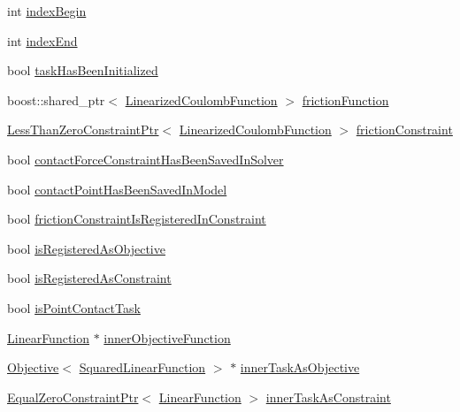 \begin{DoxyCompactItemize}
int \hyperlink{structgocra_1_1GHCJTTask_1_1Pimpl_a20542f3c613a7f9c0771c2b5ac0b38eb}{index\+Begin}
\item 
int \hyperlink{structgocra_1_1GHCJTTask_1_1Pimpl_ada601a59aeedcd018df465a5e2e79e03}{index\+End}
\item 
bool \hyperlink{structgocra_1_1GHCJTTask_1_1Pimpl_ad07475df136dd26fc89634fa6dd9a9b7}{task\+Has\+Been\+Initialized}
\item 
boost\+::shared\+\_\+ptr$<$ \hyperlink{classocra_1_1LinearizedCoulombFunction}{Linearized\+Coulomb\+Function} $>$ \hyperlink{structgocra_1_1GHCJTTask_1_1Pimpl_a777d7f0a74a42508154b153dbc0a3b44}{friction\+Function}
\item 
\hyperlink{classocra_1_1LessThanZeroConstraintPtr}{Less\+Than\+Zero\+Constraint\+Ptr}$<$ \hyperlink{classocra_1_1LinearizedCoulombFunction}{Linearized\+Coulomb\+Function} $>$ \hyperlink{structgocra_1_1GHCJTTask_1_1Pimpl_a51c9a1862cf46b8ac75a525924d990bb}{friction\+Constraint}
\item 
bool \hyperlink{structgocra_1_1GHCJTTask_1_1Pimpl_a2cb3237a503679f5dcc201c05b00f248}{contact\+Force\+Constraint\+Has\+Been\+Saved\+In\+Solver}
\item 
bool \hyperlink{structgocra_1_1GHCJTTask_1_1Pimpl_acd52e769176ed61ce95a322b1adc8c10}{contact\+Point\+Has\+Been\+Saved\+In\+Model}
\item 
bool \hyperlink{structgocra_1_1GHCJTTask_1_1Pimpl_ad92c2fff381cdb00f6afb41671e923c5}{friction\+Constraint\+Is\+Registered\+In\+Constraint}
\item 
bool \hyperlink{structgocra_1_1GHCJTTask_1_1Pimpl_ac3772fc7a816ef1ba5ac40b79908d225}{is\+Registered\+As\+Objective}
\item 
bool \hyperlink{structgocra_1_1GHCJTTask_1_1Pimpl_aace8728a2e9a0271ea89aea0355c036b}{is\+Registered\+As\+Constraint}
\item 
bool \hyperlink{structgocra_1_1GHCJTTask_1_1Pimpl_a900c0b0bf150ba085a300ff543054a36}{is\+Point\+Contact\+Task}
\item 
\hyperlink{classocra_1_1LinearFunction}{Linear\+Function} $\ast$ \hyperlink{structgocra_1_1GHCJTTask_1_1Pimpl_a1faaaea4991fa4a0bec914732c189fd3}{inner\+Objective\+Function}
\item 
\hyperlink{classocra_1_1Objective}{Objective}$<$ \hyperlink{classocra_1_1SquaredLinearFunction}{Squared\+Linear\+Function} $>$ $\ast$ \hyperlink{structgocra_1_1GHCJTTask_1_1Pimpl_a43d0c542d4107893610d8d07cce2fdd0}{inner\+Task\+As\+Objective}
\item 
\hyperlink{classocra_1_1EqualZeroConstraintPtr}{Equal\+Zero\+Constraint\+Ptr}$<$ \hyperlink{classocra_1_1LinearFunction}{Linear\+Function} $>$ \hyperlink{structgocra_1_1GHCJTTask_1_1Pimpl_aca6261d2f483c550e6e71c4d31b7c0c1}{inner\+Task\+As\+Constraint}

\end{DoxyCompactItemize}
